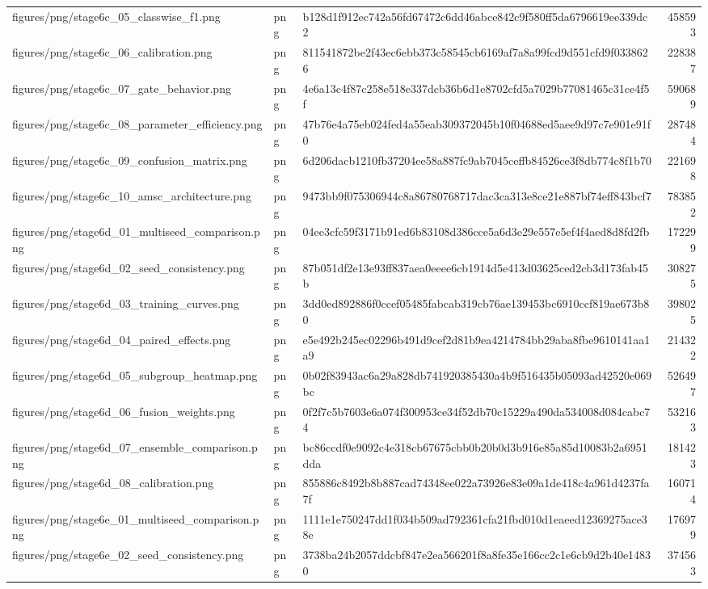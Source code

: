 \begin{tabular}{lllr}
figures/png/stage6c_05_classwise_f1.png & png & b128d1f912ec742a56fd67472c6dd46abce842c9f580ff5da6796619ee339dc2 & 458593 \\
figures/png/stage6c_06_calibration.png & png & 811541872be2f43ec6ebb373c58545cb6169af7a8a99fcd9d551cfd9f0338626 & 228387 \\
figures/png/stage6c_07_gate_behavior.png & png & 4e6a13c4f87c258e518e337dcb36b6d1e8702cfd5a7029b77081465c31ce4f5f & 590689 \\
figures/png/stage6c_08_parameter_efficiency.png & png & 47b76e4a75eb024fed4a55eab309372045b10f04688ed5aee9d97c7e901e91f0 & 287484 \\
figures/png/stage6c_09_confusion_matrix.png & png & 6d206dacb1210fb37204ee58a887fc9ab7045ceffb84526ce3f8db774c8f1b70 & 221698 \\
figures/png/stage6c_10_amsc_architecture.png & png & 9473bb9f075306944c8a86780768717dac3ca313e8ce21e887bf74eff843bcf7 & 783852 \\
figures/png/stage6d_01_multiseed_comparison.png & png & 04ee3cfc59f3171b91ed6b83108d386cce5a6d3e29e557e5ef4f4aed8d8fd2fb & 172299 \\
figures/png/stage6d_02_seed_consistency.png & png & 87b051df2e13e93ff837aea0eeee6cb1914d5e413d03625ced2cb3d173fab45b & 308275 \\
figures/png/stage6d_03_training_curves.png & png & 3dd0ed892886f0ccef05485fabcab319cb76ae139453bc6910ccf819ae673b80 & 398025 \\
figures/png/stage6d_04_paired_effects.png & png & e5e492b245ec02296b491d9cef2d81b9ea4214784bb29aba8fbe9610141aa1a9 & 214322 \\
figures/png/stage6d_05_subgroup_heatmap.png & png & 0b02f83943ac6a29a828db741920385430a4b9f516435b05093ad42520e069bc & 526497 \\
figures/png/stage6d_06_fusion_weights.png & png & 0f2f7c5b7603e6a074f300953ce34f52db70c15229a490da534008d084cabc74 & 532163 \\
figures/png/stage6d_07_ensemble_comparison.png & png & bc86ccdf0e9092c4e318cb67675cbb0b20b0d3b916e85a85d10083b2a6951dda & 181423 \\
figures/png/stage6d_08_calibration.png & png & 855886c8492b8b887cad74348ee022a73926e83e09a1de418c4a961d4237fa7f & 160714 \\
figures/png/stage6e_01_multiseed_comparison.png & png & 1111e1e750247dd1f034b509ad792361cfa21fbd010d1eaeed12369275ace38e & 176979 \\
figures/png/stage6e_02_seed_consistency.png & png & 3738ba24b2057ddcbf847e2ea566201f8a8fe35e166cc2c1e6cb9d2b40e14830 & 374563 \\

\end{tabular}
